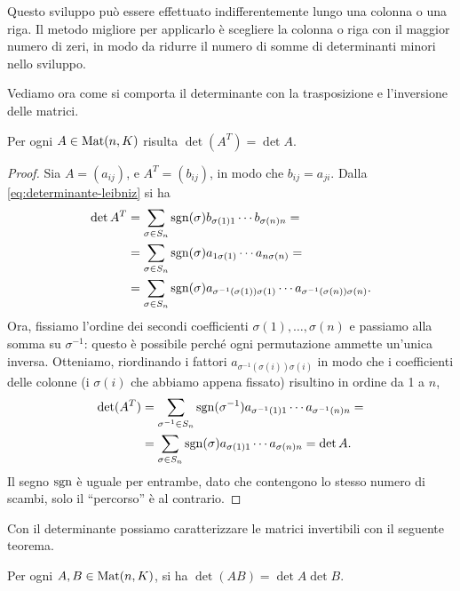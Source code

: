 Questo sviluppo può essere effettuato indifferentemente lungo una colonna o una riga.
Il metodo migliore per applicarlo è scegliere la colonna o riga con il maggior numero di zeri, in modo da ridurre il numero di somme di determinanti minori nello sviluppo.

Vediamo ora come si comporta il determinante con la trasposizione e l'inversione delle matrici.
\begin{teorema} \label{t:determinante-trasposta}
	Per ogni $A\in\operatorname{Mat}(n,K)$ risulta $\det(A^T)=\det A$.
\end{teorema}
	\begin{proof}
	Sia $A=(a_{ij})$, e $A^T=(b_{ij})$, in modo che $b_{ij}=a_{ji}$.
	Dalla \eqref{eq:determinante-leibniz} si ha
	\begin{equation}
		\begin{split}
			\det A^T &=\sum_{\sigma\in S_n}\operatorname{sgn}(\sigma)b_{\sigma(1)1}\cdots b_{\sigma(n)n}=\\
			&=\sum_{\sigma\in S_n}\operatorname{sgn}(\sigma)a_{1\sigma(1)}\cdots a_{n\sigma(n)}=\\
			&=\sum_{\sigma\in S_n}\operatorname{sgn}(\sigma)a_{\sigma^{-1}(\sigma(1))\sigma(1)}\cdots a_{\sigma^{-1}(\sigma(n))\sigma(n)}.
		\end{split}
	\end{equation}
	Ora, fissiamo l'ordine dei secondi coefficienti $\sigma(1),\dots,\sigma(n)$ e passiamo alla somma su $\sigma^{-1}$: questo è possibile perch\'e ogni permutazione ammette un'unica inversa.
	Otteniamo, riordinando i fattori $a_{\sigma^{-1}(\sigma(i))\sigma(i)}$ in modo che i coefficienti delle colonne (i $\sigma(i)$ che abbiamo appena fissato) risultino in ordine da 1 a $n$,
	\begin{equation}
		\begin{split}
			\det(A^T)&=\sum_{\sigma^{-1}\in S_n}\operatorname{sgn}(\sigma^{-1})a_{\sigma^{-1}(1)1}\cdots a_{\sigma^{-1}(n)n}=\\
			&=\sum_{\sigma\in S_n}\operatorname{sgn}(\sigma)a_{\sigma(1)1}\cdots a_{\sigma(n)n}=\det A.
		\end{split}
	\end{equation}
	Il segno $\operatorname{sgn}$ è uguale per entrambe, dato che contengono lo stesso numero di scambi, solo il ``percorso'' è al contrario.
\end{proof}
Con il determinante possiamo caratterizzare le matrici invertibili con il seguente teorema.
\begin{teorema}[di Binet] \label{t:binet}
	Per ogni $A,B\in\operatorname{Mat}(n,K)$, si ha $\det(AB)=\det A\det B$.
\end{teorema}
